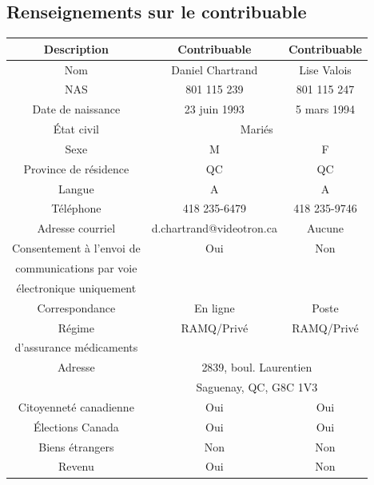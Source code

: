 \subsection{Renseignements sur le contribuable}
\begin{center}
	\begin{tabular}{|c|c|c|}
		\hline
		\rowcolor{LightGreen}Description &    Contribuable \no 1    & Contribuable \no 2 \\ \hline
		              Nom                &     Daniel Chartrand     &    Lise Valois     \\ \hline
		              NAS                &       801 115 239        &    801 115 247     \\ \hline
		       Date de naissance         &       23 juin 1993       &    5 mars 1994     \\ \hline
		           État civil            &          \multicolumn{2}{c|}{Mariés}          \\ \hline
		              Sexe               &            M             &         F          \\ \hline
		     Province de résidence       &            QC            &         QC         \\ \hline
		             Langue              &            A             &         A          \\ \hline
		           Téléphone             &       418 235-6479       &    418 235-9746    \\ \hline
		        Adresse courriel         & d.chartrand@videotron.ca &       Aucune       \\ \hline
		   Consentement à l'envoi de     &           Oui            &        Non         \\
		    communications par voie      &                          &                    \\
		    électronique uniquement      &                          &                    \\ \hline
		         Correspondance          &         En ligne         &       Poste        \\ \hline
		             Régime              &        RAMQ/Privé        &     RAMQ/Privé     \\
		    d'assurance médicaments      &                          &                    \\ \hline
		            Adresse              &  \multicolumn{2}{c|}{2839, boul. Laurentien}  \\
		                                 &  \multicolumn{2}{c|}{Saguenay, QC, G8C 1V3}   \\ \hline
		     Citoyenneté canadienne      &           Oui            &        Oui         \\ \hline
		        Élections Canada         &           Oui            &        Oui         \\ \hline
		        Biens étrangers          &           Non            &        Non         \\ \hline
		             Revenu              &           Oui            &        Non         \\ \hline
	\end{tabular}
\end{center}

